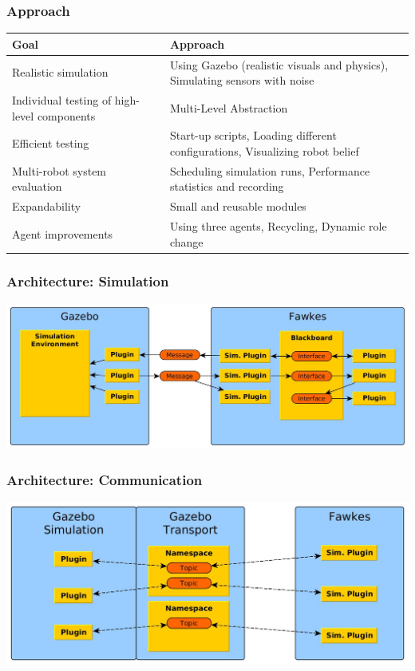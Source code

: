 \documentclass[]{beamer}
\begin{document}
\begin{frame}
  \frametitle{Approach}
  \begin{tabular}{p{3.7cm}|p{7.5cm}}
    \hline
    \large{\textbf{Goal}} & \large{\textbf{Approach}}\\
    \hline
    Realistic simulation & Using Gazebo (realistic visuals and physics), \newline Simulating sensors with noise \pause \\ 
    \hline
    Individual testing of high-level components & Multi-Level Abstraction \pause \\
    \hline
    Efficient testing & Start-up scripts, \newline Loading different configurations, \newline Visualizing robot belief \pause\\ 
    \hline
    Multi-robot system evaluation & Scheduling simulation runs, \newline Performance statistics and recording \pause\\    
    \hline
    Expandability & Small and reusable modules \pause\\
    \hline
    Agent improvements & Using three agents, \newline Recycling, \newline Dynamic role change\\
    \hline    
  \end{tabular}
\end{frame}

\begin{frame}
  \frametitle{Architecture: Simulation}
  \includegraphics[width=\textwidth]{../tabs/fawkes_gazebo.jpg}
\end{frame}

\begin{frame}
  \frametitle{Architecture: Communication}
  \includegraphics[width=\textwidth]{../tabs/communication.jpg}
\end{frame}
\end{document}
